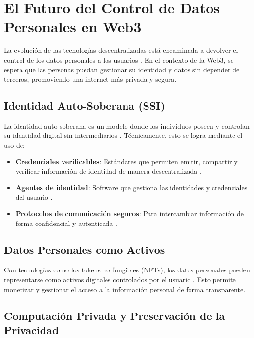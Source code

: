 \section{El Futuro del Control de Datos Personales en Web3}

La evolución de las tecnologías descentralizadas está encaminada a devolver el control de los datos personales a los usuarios \cite{w3cverifiable}. En el contexto de la Web3, se espera que las personas puedan gestionar su identidad y datos sin depender de terceros, promoviendo una internet más privada y segura.

\subsection{Identidad Auto-Soberana (SSI)}

La identidad auto-soberana es un modelo donde los individuos poseen y controlan su identidad digital sin intermediarios \cite{allen2016sovrin}. Técnicamente, esto se logra mediante el uso de:

\begin{itemize}
    \item \textbf{Credenciales verificables}: Estándares que permiten emitir, compartir y verificar información de identidad de manera descentralizada \cite{w3cverifiable}.
    \item \textbf{Agentes de identidad}: Software que gestiona las identidades y credenciales del usuario \cite{preukschat2020self}.
    \item \textbf{Protocolos de comunicación seguros}: Para intercambiar información de forma confidencial y autenticada \cite{hardman2019aries}.
\end{itemize}

\subsection{Datos Personales como Activos}

Con tecnologías como los tokens no fungibles (NFTs), los datos personales pueden representarse como activos digitales controlados por el usuario \cite{wang2021non}. Esto permite monetizar y gestionar el acceso a la información personal de forma transparente.

\subsection{Computación Privada y Preservación de la Privacidad}

